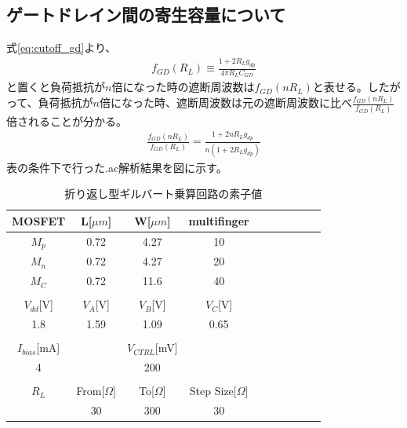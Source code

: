 \documentclass[twocolumn]{jsarticle}
\begin{document}
    

\subsection{ゲートドレイン間の寄生容量について}
    式\eqref{eq:cutoff_gd}より、
    \begin{align*}
        f_{GD}(R_{L})\equiv\frac{1+2R_{L}g_{dp}}{4\pi R_{L}C_{GD}}
    \end{align*}
    と置くと負荷抵抗が$n$倍になった時の遮断周波数は$f_{GD}(nR_{L})$と表せる。したがって、負荷抵抗が$n$倍になった時、遮断周波数は元の遮断周波数に比べ$\frac{f_{GD}(nR_{L})}{f_{GD}(R_{L})}$倍されることが分かる。
    \begin{align*}
        \frac{f_{GD}(nR_{L})}{f_{GD}(R_{L})}=\frac{1+2nR_{L}g_{dp}}{n(1+2R_{L}g_{dp})}
    \end{align*}
    表の条件下で行った.ac解析結果を図に示す。

    \begin{table}[h]
        \caption{折り返し型ギルバート乗算回路の素子値}
        \label{table:sim_gd}
        \centering
        \begin{tabular}{cccccccccc}
            MOSFET & L[$\mu m$] & W[$\mu m$] & multifinger\\
            \hline \hline
            $M_{p}$ & 0.72 & 4.27 & 10 \\
            $M_{n}$ & 0.72 & 4.27 & 20 \\
            $M_{C}$ & 0.72 & 11.6 & 40 \\
            &&&\\
            $V_{dd}$[V] & $V_{A}$[V] & $V_{B}$[V] & $V_{C}$[V]\\
            \hline\hline
            1.8 & 1.59 & 1.09 & 0.65 \\
            &&&\\
            $I_{bias}$[mA] & & $V_{CTRL}$[mV] & \\
            \hline\hline
            4 & & 200 & \\
            &&&\\
            $R_{L}$ & From[$\Omega$] & To[$\Omega$] & Step Size[$\Omega$]\\
            \hline\hline
            & 30 & 300 & 30
        \end{tabular}
    \end{table}
\end{document}
